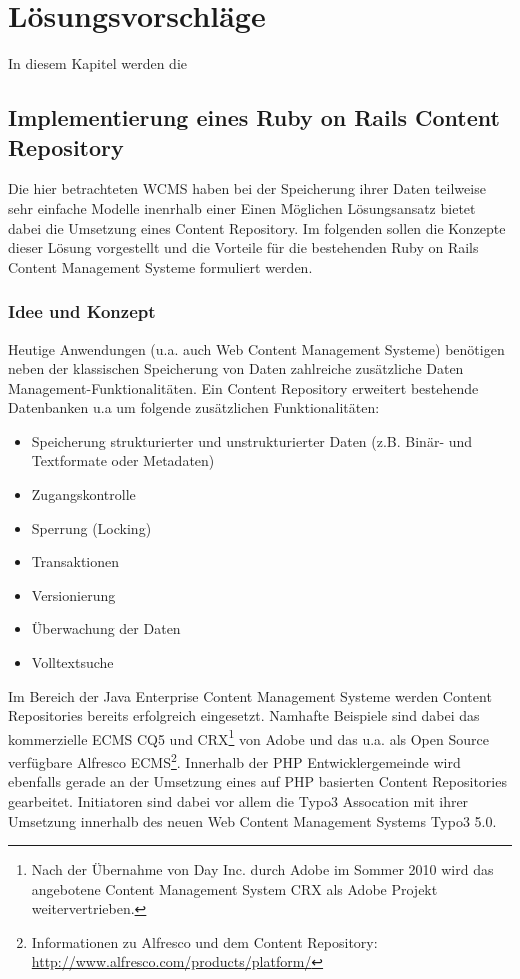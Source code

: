 \chapter{Lösungsvorschläge}
In diesem Kapitel werden die
\section{Implementierung eines Ruby on Rails Content Repository}

Die hier betrachteten WCMS haben bei der Speicherung ihrer Daten teilweise sehr einfache Modelle inenrhalb einer
Einen Möglichen Lösungsansatz bietet dabei die Umsetzung eines Content Repository. Im folgenden sollen die Konzepte dieser Lösung vorgestellt und die Vorteile für die bestehenden Ruby on Rails Content Management Systeme formuliert werden.


\subsection{Idee und Konzept}

Heutige Anwendungen (u.a. auch Web Content Management Systeme) benötigen neben der klassischen Speicherung von Daten zahlreiche zusätzliche Daten Management-Funktionalitäten. Ein Content Repository erweitert bestehende Datenbanken u.a um folgende zusätzlichen Funktionalitäten:

\begin{itemize}
\item
Speicherung strukturierter und unstrukturierter Daten (z.B. Binär- und Textformate oder Metadaten)
\item
Zugangskontrolle
\item
Sperrung (Locking)
\item
Transaktionen
\item
Versionierung
\item
Überwachung der Daten
\item
Volltextsuche
\end{itemize}

Im Bereich der Java Enterprise Content Management Systeme werden Content Repositories bereits erfolgreich eingesetzt. Namhafte Beispiele sind dabei das kommerzielle ECMS CQ5 und CRX\footnote{Nach der Übernahme von Day Inc. durch Adobe im Sommer 2010 wird das angebotene Content Management System CRX als Adobe Projekt weitervertrieben.} von Adobe und das u.a. als Open Source verfügbare Alfresco ECMS\footnote{Informationen zu Alfresco und dem Content Repository: \href{http://www.alfresco.com/products/platform/}{http://www.alfresco.com/products/platform/}}.
Innerhalb der PHP Entwicklergemeinde wird ebenfalls gerade an der Umsetzung eines auf PHP basierten Content Repositories gearbeitet. Initiatoren sind dabei vor allem die Typo3 Assocation mit ihrer Umsetzung innerhalb des neuen Web Content Management Systems Typo3 5.0.


